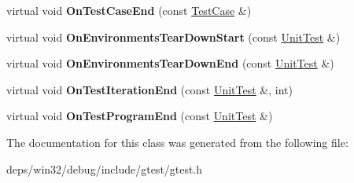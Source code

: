 \begin{DoxyCompactItemize}
\item 
\hypertarget{classtesting_1_1_empty_test_event_listener_a6bec703158283104c4298f7d8a528515}{}virtual void {\bfseries On\+Test\+Case\+End} (const \hyperlink{classtesting_1_1_test_case}{Test\+Case} \&)\label{classtesting_1_1_empty_test_event_listener_a6bec703158283104c4298f7d8a528515}

\item 
\hypertarget{classtesting_1_1_empty_test_event_listener_a00fa1a4ea5831e20746188414268e7c6}{}virtual void {\bfseries On\+Environments\+Tear\+Down\+Start} (const \hyperlink{classtesting_1_1_unit_test}{Unit\+Test} \&)\label{classtesting_1_1_empty_test_event_listener_a00fa1a4ea5831e20746188414268e7c6}

\item 
\hypertarget{classtesting_1_1_empty_test_event_listener_aea64c83c415b33a4c0b0239bafd1438d}{}virtual void {\bfseries On\+Environments\+Tear\+Down\+End} (const \hyperlink{classtesting_1_1_unit_test}{Unit\+Test} \&)\label{classtesting_1_1_empty_test_event_listener_aea64c83c415b33a4c0b0239bafd1438d}

\item 
\hypertarget{classtesting_1_1_empty_test_event_listener_a2253e5a18b3cf7bccd349567a252209d}{}virtual void {\bfseries On\+Test\+Iteration\+End} (const \hyperlink{classtesting_1_1_unit_test}{Unit\+Test} \&, int)\label{classtesting_1_1_empty_test_event_listener_a2253e5a18b3cf7bccd349567a252209d}

\item 
\hypertarget{classtesting_1_1_empty_test_event_listener_a0abcc02bd2331a2e29ad6f4d9daf2a32}{}virtual void {\bfseries On\+Test\+Program\+End} (const \hyperlink{classtesting_1_1_unit_test}{Unit\+Test} \&)\label{classtesting_1_1_empty_test_event_listener_a0abcc02bd2331a2e29ad6f4d9daf2a32}

\end{DoxyCompactItemize}


The documentation for this class was generated from the following file\+:\begin{DoxyCompactItemize}
\item 
deps/win32/debug/include/gtest/gtest.\+h\end{DoxyCompactItemize}
